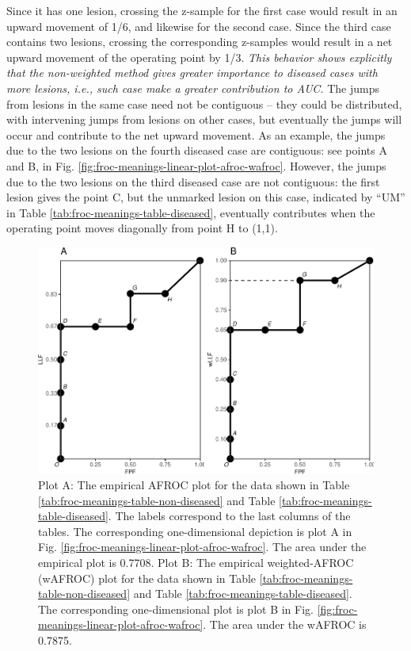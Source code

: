 \documentclass[
]{book}
\begin{document}
Since it has one lesion, crossing the z-sample for the first case would result in an upward movement of 1/6, and likewise for the second case. Since the third case contains two lesions, crossing the corresponding z-samples would result in a net upward movement of the operating point by 1/3. \emph{This behavior shows explicitly that the non-weighted method gives greater importance to diseased cases with more lesions, i.e., such case make a greater contribution to AUC.} The jumps from lesions in the same case need not be contiguous -- they could be distributed, with intervening jumps from lesions on other cases, but eventually the jumps will occur and contribute to the net upward movement. As an example, the jumps due to the two lesions on the fourth diseased case are contiguous: see points A and B, in Fig. \ref{fig:froc-meanings-linear-plot-afroc-wafroc}. However, the jumps due to the two lesions on the third diseased case are not contiguous: the first lesion gives the point C, but the unmarked lesion on this case, indicated by ``UM'' in Table \ref{tab:froc-meanings-table-diseased}, eventually contributes when the operating point moves diagonally from point H to (1,1).

\begin{figure}
\centering
\includegraphics{14-froc-meanings-foms-ocs_files/figure-latex/froc-meanings-afroc-wafroc-1.pdf}
\caption{\label{fig:froc-meanings-afroc-wafroc}Plot A: The empirical AFROC plot for the data shown in Table \ref{tab:froc-meanings-table-non-diseased} and Table \ref{tab:froc-meanings-table-diseased}. The labels correspond to the last columns of the tables. The corresponding one-dimensional depiction is plot A in Fig. \ref{fig:froc-meanings-linear-plot-afroc-wafroc}. The area under the empirical plot is 0.7708. Plot B: The empirical weighted-AFROC (wAFROC) plot for the data shown in Table \ref{tab:froc-meanings-table-non-diseased} and Table \ref{tab:froc-meanings-table-diseased}. The corresponding one-dimensional plot is plot B in Fig. \ref{fig:froc-meanings-linear-plot-afroc-wafroc}. The area under the wAFROC is 0.7875.}
\end{figure}
\end{document}
